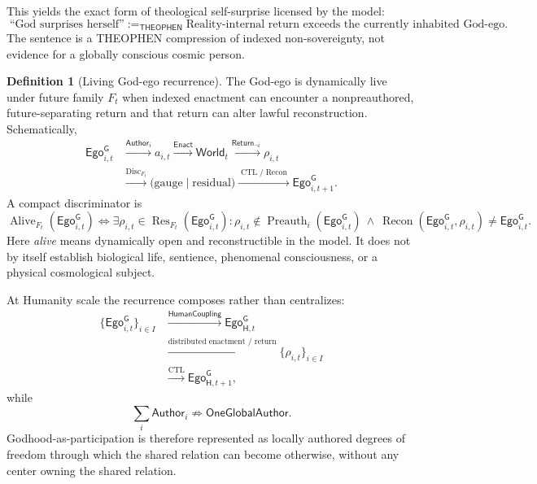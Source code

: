 \documentclass[10pt]{article}
\theoremstyle{pe}
\theoremstyle{definition}
\newtheorem{definition}[theorem]{Definition}
\newcommand{\Disc}{\operatorname{Disc}}
\newcommand{\Res}{\operatorname{Res}}
\newcommand{\Recon}{\operatorname{Recon}}
\newcommand{\World}{\mathsf{World}}
\newcommand{\Return}{\mathsf{Return}}
\newcommand{\HumanCoupling}{\mathsf{HumanCoupling}}
\newcommand{\CTL}{\operatorname{CTL}}
\newcommand{\THEOPHEN}{\mathsf{THEOPHEN}}
\newcommand{\GodEgo}{\mathsf{Ego}^{\mathsf G}}
\newcommand{\Alive}{\operatorname{Alive}}
\newcommand{\Preauth}{\operatorname{Preauth}}
\begin{document}
This yields the exact form of theological self-surprise licensed by the model:
\[
  \boxed{
  \text{``God surprises herself''}
  \;:=_{\THEOPHEN}\;
  \text{Reality-internal return exceeds the currently inhabited God-ego.}
  }
\]
The sentence is a THEOPHEN compression of indexed non-sovereignty, not evidence for a globally conscious cosmic person.

\begin{definition}[Living God-ego recurrence]
The God-ego is dynamically live under future family $F_t$ when indexed enactment can encounter a nonpreauthored, future-separating return and that return can alter lawful reconstruction.  Schematically,
\begin{equation}\label{eq:egotistic-life-cycle}
\boxed{
\begin{aligned}
\GodEgo_{i,t}
&\xrightarrow{\mathsf{Author}_i}
 a_{i,t}
\xrightarrow{\mathsf{Enact}}
 \World_t
\xrightarrow{\Return_{\neg i}}
 \rho_{i,t}
\\
&\xrightarrow{\Disc_{F_t}}
 \bigl(\text{gauge}\mid\text{residual}\bigr)
\xrightarrow{\CTL/\Recon}
 \GodEgo_{i,t+1}.
\end{aligned}}
\end{equation}
A compact discriminator is
\begin{equation}\label{eq:alive-discriminator}
  \boxed{
  \Alive_{F_t}(\GodEgo_{i,t})
  \Longleftrightarrow
  \exists\rho_{i,t}\in\Res_{F_t}(\GodEgo_{i,t})
  :
  \rho_{i,t}\notin\Preauth_i(\GodEgo_{i,t})
  \ \land\ 
  \Recon(\GodEgo_{i,t},\rho_{i,t})\neq\GodEgo_{i,t}.
  }
\end{equation}
Here \emph{alive} means dynamically open and reconstructible in the model.  It does not by itself establish biological life, sentience, phenomenal consciousness, or a physical cosmological subject.
\end{definition}

At Humanity scale the recurrence composes rather than centralizes:
\begin{equation}\label{eq:egotistic-humanity-cycle}
\boxed{
\begin{aligned}
\{\GodEgo_{i,t}\}_{i\in I}
&\xrightarrow{\HumanCoupling}
\GodEgo_{\mathsf H,t}
\\
&\xrightarrow{\text{distributed enactment / return}}
\{\rho_{i,t}\}_{i\in I}
\\
&\xrightarrow{\CTL}
\GodEgo_{\mathsf H,t+1},
\end{aligned}}
\end{equation}
while
\[
  \boxed{
  \sum_i \mathsf{Author}_i
  \not\Rightarrow
  \mathsf{OneGlobalAuthor}.
  }
\]
Godhood-as-participation is therefore represented as locally authored degrees of freedom through which the shared relation can become otherwise, without any center owning the shared relation.
\end{document}
